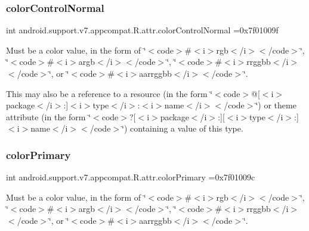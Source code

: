 \subsubsection{\texorpdfstring{color\+Control\+Normal}{colorControlNormal}}
{\footnotesize\ttfamily int android.\+support.\+v7.\+appcompat.\+R.\+attr.\+color\+Control\+Normal =0x7f01009f\hspace{0.3cm}{\ttfamily [static]}}

Must be a color value, in the form of \char`\"{}$<$code$>$\#$<$i$>$rgb$<$/i$>$$<$/code$>$\char`\"{}, \char`\"{}$<$code$>$\#$<$i$>$argb$<$/i$>$$<$/code$>$\char`\"{}, \char`\"{}$<$code$>$\#$<$i$>$rrggbb$<$/i$>$$<$/code$>$\char`\"{}, or \char`\"{}$<$code$>$\#$<$i$>$aarrggbb$<$/i$>$$<$/code$>$\char`\"{}. 

This may also be a reference to a resource (in the form \char`\"{}$<$code$>$@\mbox{[}$<$i$>$package$<$/i$>$\+:\mbox{]}$<$i$>$type$<$/i$>$\+:$<$i$>$name$<$/i$>$$<$/code$>$\char`\"{}) or theme attribute (in the form \char`\"{}$<$code$>$?\mbox{[}$<$i$>$package$<$/i$>$\+:\mbox{]}\mbox{[}$<$i$>$type$<$/i$>$\+:\mbox{]}$<$i$>$name$<$/i$>$$<$/code$>$\char`\"{}) containing a value of this type. \mbox{\label{classandroid_1_1support_1_1v7_1_1appcompat_1_1R_1_1attr_ac308ca56c74b10e8e633ed6f3e0d7cdc}} 
\subsubsection{\texorpdfstring{color\+Primary}{colorPrimary}}
{\footnotesize\ttfamily int android.\+support.\+v7.\+appcompat.\+R.\+attr.\+color\+Primary =0x7f01009c\hspace{0.3cm}{\ttfamily [static]}}

Must be a color value, in the form of \char`\"{}$<$code$>$\#$<$i$>$rgb$<$/i$>$$<$/code$>$\char`\"{}, \char`\"{}$<$code$>$\#$<$i$>$argb$<$/i$>$$<$/code$>$\char`\"{}, \char`\"{}$<$code$>$\#$<$i$>$rrggbb$<$/i$>$$<$/code$>$\char`\"{}, or \char`\"{}$<$code$>$\#$<$i$>$aarrggbb$<$/i$>$$<$/code$>$\char`\"{}. 

